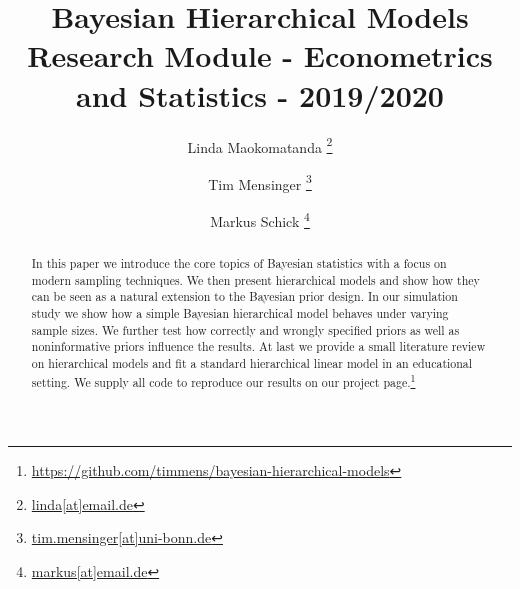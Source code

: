 \documentclass[a4paper,11.5pt]{article}
\title{\textbf{Bayesian Hierarchical Models}\\
\large Research Module - Econometrics and Statistics - 2019/2020
}
\date{}
\author{Linda Maokomatanda%
  \thanks{\href{mailto:linda@email.de}{linda[at]email.de}}}
\author{Tim Mensinger%
  \thanks{\href{mailto:tim.mensinger@uni-bonn.de}{tim.mensinger[at]uni-bonn.de}}}
\author{Markus Schick%
  \thanks{\href{mailto:markus@email.de}{markus[at]email.de}}}
\affil{University of Bonn}
\begin{document}
\setlength{\abovedisplayskip}{-20pt}
\setlength{\belowdisplayskip}{0pt}
\setlength{\abovedisplayshortskip}{0pt}
\setlength{\belowdisplayshortskip}{0pt}
\onehalfspacing

\thispagestyle{empty}
\maketitle
\begin{abstract}
  In this paper we introduce the core topics of Bayesian statistics with a focus on modern sampling techniques.
  We then present hierarchical models and show how they can be seen as a natural extension to the Bayesian prior design.
  In our simulation study we show how a simple Bayesian hierarchical model behaves under varying sample sizes. We further test how correctly and wrongly specified priors as well as noninformative priors influence the results.
  At last we provide a small literature review on hierarchical models and fit a standard hierarchical linear model in an educational setting. We supply all code to reproduce our results on our project page.\footnote{\url{https://github.com/timmens/bayesian-hierarchical-models}}
\end{abstract}

\newpage
\setcounter{tocdepth}{2}
\tableofcontents
\newpage

\pagestyle{plain}


\newpage




\newpage



\appendix

\end{document}
